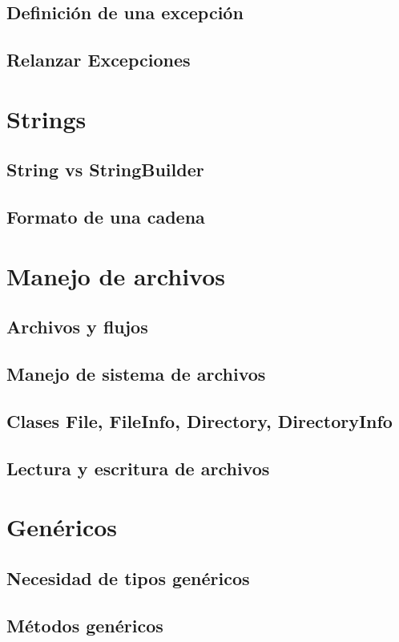 \documentclass[12pt,a4paper]{report}
\begin{document}
{\section{Definición de una excepción}
\section{Relanzar Excepciones}

\chapter{Strings}
\section{String vs StringBuilder}
\section{Formato de una cadena}
	
\chapter{Manejo de archivos}
\section{Archivos y flujos}
\section{Manejo de sistema de archivos}
\section{Clases File, FileInfo, Directory, DirectoryInfo}
\section{Lectura y escritura de archivos}

\chapter{Genéricos}
\section{Necesidad de tipos genéricos}
\section{Métodos genéricos}
}
\end{document}
